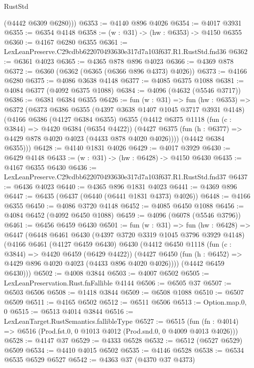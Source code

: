 \begin{lexlean}{RustStd}
\begin{coremodule}
        (@4442 @6309 @6280)))
@6353 := @4140 @896 @4026
@6354 := @4017 @3931
@6355 := @6354 @4148
@6358 := (w : @31) -> (hw : @6353) -> @4150 @6355
@6360 := @4167 @6280 @6355
@6361 := LexLeanPreserve.C29cdbb622070493630e317d7a103f637.R1.RustStd.fnd36
@6362 := @6361 @4023
@6365 := @4365 @878 @896 @4023
@6366 := @4369 @878
@6372 := @6360 (@6362 (@6365 (@6366 @896 @4373) @4026))
@6373 := @4166 @6280
@6375 := @4086 @3638 @4148
@6377 := @4085 @6375 @1088
@6381 := @4084 @6377 (@4092 @6375 @1088)
@6384 := @4096 (@4632 (@5546 @3717))
@6386 := @6381 @6384 @6355
@6426 := fun (w : @31) =>
  fun (hw : @6353) =>
  @6372
    (@6373
      @6386
      @6355
      (@4397 @3638 @1407 @1045 @3717 @3931 @4148)
      (@4166
        @6386
        (@4127 @6384 @6355)
        @6355
        (@4412
          @6375
          @1118
          (fun (c : @3844) => @4420 @6384 (@6354 @4422))
          (@4427 @6375 (fun (h : @6377) => @4429 @878 @4020 @4023 (@4433 @878 @4020 @4026))))
        (@4442 @6384 @6355)))
@6428 := @4140 @1831 @4026
@6429 := @4017 @3929
@6430 := @6429 @4148
@6433 := (w : @31) -> (hw : @6428) -> @4150 @6430
@6435 := @4167 @6355 @6430
@6436 := LexLeanPreserve.C29cdbb622070493630e317d7a103f637.R1.RustStd.fnd37
@6437 := @6436 @4023
@6440 := @4365 @896 @1831 @4023
@6441 := @4369 @896
@6447 := @6435 (@6437 (@6440 (@6441 @1831 @4373) @4026))
@6448 := @4166 @6355
@6450 := @4086 @3720 @4148
@6452 := @4085 @6450 @1088
@6456 := @4084 @6452 (@4092 @6450 @1088)
@6459 := @4096 (@6078 (@5546 @3796))
@6461 := @6456 @6459 @6430
@6501 := fun (w : @31) =>
  fun (hw : @6428) =>
  @6447
    (@6448
      @6461
      @6430
      (@4397 @3720 @3319 @1045 @3796 @3929 @4148)
      (@4166
        @6461
        (@4127 @6459 @6430)
        @6430
        (@4412
          @6450
          @1118
          (fun (c : @3844) => @4420 @6459 (@6429 @4422))
          (@4427 @6450 (fun (h : @6452) => @4429 @896 @4020 @4023 (@4433 @896 @4020 @4026))))
        (@4442 @6459 @6430)))
@6502 := @4008 @3844
@6503 := @4007 @6502
@6505 := LexLeanPreservation.Rust.fnFallible @4144
@6506 := @6505 @37
@6507 := @6503 @6506
@6508 := @1418 @3844
@6509 := @6508 @1088
@6510 := @6507 @6509
@6511 := @4165 @6502
@6512 := @6511 @6506
@6513 := Option.map.{0, 0}
@6515 := @6513 @4014 @3844
@6516 := LexLeanTarget.RustSemantics.fallibleType
@6527 := @6515
    (fun (fn : @4014) => @6516 (Prod.fst.{0, 0} @1013 @4012 (Prod.snd.{0, 0} @4009 @4013 @4026)))
@6528 := @4147 @37
@6529 := @4333 @6528
@6532 := @6512 (@6527 @6529) @6509
@6534 := @4410 @4015 @6502
@6535 := @4146 @6528
@6538 := @6534 @6535 @6529 @6527
@6542 := @4363 @37 (@4370 @37 @4373)

\end{coremodule}
\end{lexlean}
